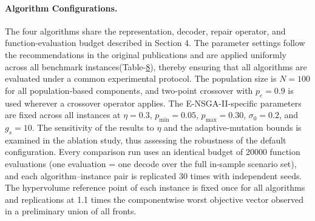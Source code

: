 \documentclass[11pt, a4paper]{article}
\begin{document}
\paragraph{Algorithm Configurations.}The four algorithms share the representation, decoder, repair operator, and function-evaluation budget described in Section 4. The parameter settings follow the recommendations in the original publications and are applied uniformly across all benchmark instances(Table-\protect\hyperlink{tab:AlgoParams}{8}), thereby ensuring that all algorithms are evaluated under a common experimental protocol. The population size is $N = 100$ for all population-based components, and two-point crossover with $p_c = 0.9$ is used wherever a crossover operator applies. The E-NSGA-II-specific parameters are fixed across all instances at $\eta = 0.3$, $p_{\min} = 0.05$, $p_{\max} = 0.30$, $\sigma_0 = 0.2$, and $g_s = 10$. The sensitivity of the results to $\eta$ and the adaptive-mutation bounds is examined in the ablation study, thus assessing the robustness of the default configuration. Every comparison run uses an identical budget of 20000 function evaluations (one evaluation = one decode over the full in-sample scenario set), and each algorithm--instance pair is replicated 30 times with independent seeds. The hypervolume reference point of each instance is fixed once for all algorithms and replications at 1.1 times the componentwise worst objective vector observed in a preliminary union of all fronts.

\hypertarget{tab:AlgoParams}{}
\begin{table}[!htb]
\caption{Algorithm Configurations (Recommended Settings)}
\centering
{}
\label{tab:AlgoParams}
\end{table}
\protect\hypertarget{tab:AlgoParams}{}{}
\end{document}
